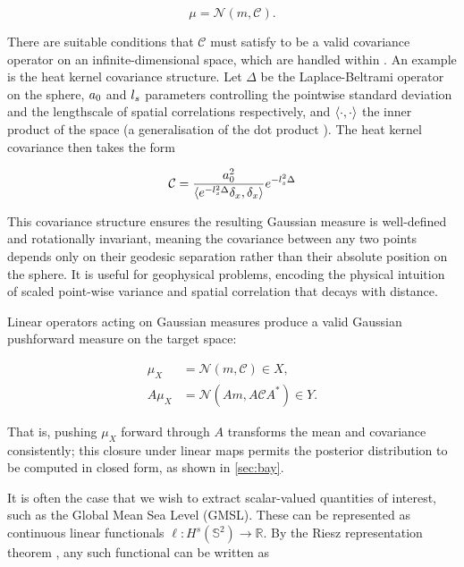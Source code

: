 \begin{equation}
\mu = \mathcal{N}\left(m, \mathcal{C}\right).
\end{equation}

There are suitable conditions that $\mathcal{C}$ must satisfy to be a valid covariance operator on an infinite-dimensional space, which are handled within . An example is the heat kernel covariance structure. Let $\Delta$ be the Laplace-Beltrami operator on the sphere, $a_0$ and $l_s$ parameters controlling the pointwise standard deviation and the lengthscale of spatial correlations respectively, and $\braket{\cdot,\cdot}$ the inner product of the space (a generalisation of the dot product \autocite{parkerGeophysicalInverseTheory1994}). The heat kernel covariance then takes the form

\begin{equation}
  \mathcal{C}_{} = \frac{a_0^2}{\braket{e^{-l_s^2\Delta}\delta_x,\delta_x}} e^{-l_s^2 \Delta}\label{eq:heat_kernel_covariance}
\end{equation}

This covariance structure ensures the resulting Gaussian measure is well-defined and rotationally invariant, meaning the covariance between any two points depends only on their geodesic separation rather than their absolute position on the sphere. It is useful for geophysical problems, encoding the physical intuition of scaled point-wise variance and spatial correlation that decays with distance.

Linear operators acting on Gaussian measures produce a valid Gaussian pushforward measure on the target space:

\begin{align}
\mu_X &= \mathcal{N}\left(m, \mathcal{C}\right) \in X, \\
A\mu_X &= \mathcal{N}\left(Am, A\mathcal{C}A^*\right) \in Y.
\end{align}

That is, pushing $\mu_X$ forward through $A$ transforms the mean and covariance consistently; this closure under linear maps permits the posterior distribution to be computed in closed form, as shown in \autoref{sec:bay}.

It is often the case that we wish to extract scalar-valued quantities of interest, such as the Global Mean Sea Level (GMSL). These can be represented as continuous linear functionals $\ell: H^s\left(\mathbb{S}^2\right) \rightarrow \mathbb{R}$. By the Riesz representation theorem \autocite{rudinFunctionalAnalysis1991}, any such functional can be written as

